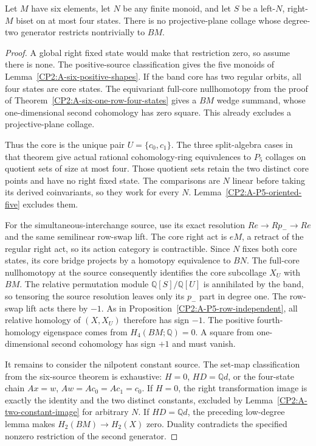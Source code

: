 \begin{proposition}
\label{CP2:A-six-oriented-four}
Let $M$ have six elements, let $N$ be any finite monoid,
and let $S$ be a left-$N$, right-$M$ biset on at most four
states. There is no projective-plane collage whose
degree-two generator restricts nontrivially to $BM$.
\end{proposition}
\begin{proof}
A global right fixed state would make that restriction
zero, so assume there is none. The positive-source
classification gives the five monoids of
Lemma~\ref{CP2:A-six-positive-shapes}.
If the band core has two regular orbits, all four states
are core states. The equivariant full-core nullhomotopy
from the proof of Theorem~\ref{CP2:A-six-one-row-four-states}
gives a $BM$ wedge summand, whose one-dimensional second
cohomology has zero square. This already excludes a
projective-plane collage.

Thus the core is the unique pair $U=\{c_0,c_1\}$.
The three split-algebra cases in that theorem give actual
rational cohomology-ring equivalences to $P_5$ collages
on quotient sets of size at most four. Those quotient
sets retain the two distinct core points and have no
right fixed state. The comparisons are $N$ linear before
taking its derived coinvariants, so they work for every
$N$. Lemma~\ref{CP2:A-P5-oriented-five} excludes them.

For the simultaneous-interchange source, use its exact
resolution $Re\to Rp_-\to Re$ and the same semilinear
row-swap lift. The core right act is $eM$, a retract of
the regular right act, so its action category is
contractible. Since $N$ fixes both core states, its core
bridge projects by a homotopy equivalence to $BN$.
The full-core nullhomotopy at the source consequently
identifies the core subcollage $X_U$ with $BM$.
The relative permutation module $\mathbb Q[S]/\mathbb Q[U]$
is annihilated by the band, so tensoring the source
resolution leaves only its $p_-$ part in degree one.
The row-swap lift acts there by $-1$.
As in Proposition~\ref{CP2:A-P5-row-independent}, all
relative homology of $(X,X_U)$ therefore has sign $-1$.
The positive fourth-homology eigenspace comes from
$H_4(BM;\mathbb Q)=0$. A square from one-dimensional
second cohomology has sign $+1$ and must vanish.

It remains to consider the nilpotent constant source.
The set-map classification from the six-source theorem
is exhaustive: $H=0$, $HD=\mathbb Qd$, or the four-state
chain $Ax=w$, $Aw=Ac_0=Ac_1=c_0$.
If $H=0$, the right transformation image is exactly the
identity and the two distinct constants, excluded by
Lemma~\ref{CP2:A-two-constant-image} for arbitrary $N$.
If $HD=\mathbb Qd$, the preceding low-degree lemma makes
$H_2(BM)\to H_2(X)$ zero. Duality contradicts the
specified nonzero restriction of the second generator.


\end{proof}
